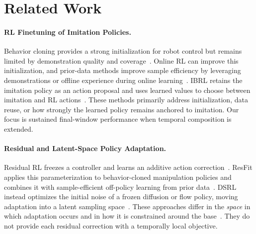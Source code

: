 \documentclass[letterpaper]{article} %
\begin{document}
\section{Related Work}
\label{sec:related}
\paragraph{RL Finetuning of Imitation Policies.}
Behavior cloning provides a strong initialization for robot control but remains limited
by demonstration quality and coverage~\cite{ross2011dagger,mandlekar2021matters}. Online RL can improve this initialization, and
prior-data methods improve sample efficiency by leveraging demonstrations or offline
experience during online learning~\cite{ball2023efficient,nakamoto2023calql,zhang2023pex,li2023explore,rajeswaran2018learning,nair2018overcoming,pertsch2021accelerating}. IBRL retains the imitation policy as an
action proposal and uses learned values to choose between imitation and RL
actions~\cite{hu2023imitation}. These methods primarily address initialization, data
reuse, or how strongly the learned policy remains anchored to imitation. Our focus is
sustained final-window performance when temporal composition is extended.

\paragraph{Residual and Latent-Space Policy Adaptation.}
Residual RL freezes a controller and learns an additive action
correction~\cite{johannink2019residual,yuan2025policydecorator}. ResFit applies this parameterization to
behavior-cloned manipulation policies and combines it with sample-efficient off-policy
learning from prior data~\cite{resfit2025residual,ball2023efficient}. DSRL instead
optimizes the initial noise of a frozen diffusion or flow policy, moving adaptation
into a latent sampling space~\cite{wagenmaker2025dsrl}. These approaches differ in the
\emph{space} in which adaptation occurs and in how it is constrained around the base~\cite{ren2025dppo,wang2023diffusion}.
They do not provide each residual correction with a temporally local objective.
\end{document}
